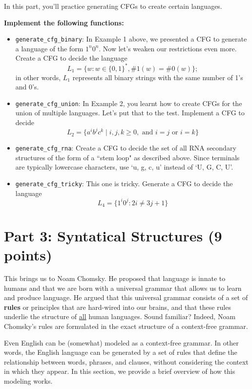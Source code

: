 \documentclass{article}
\begin{document}
\begin{tcolorbox}[enhanced,interior style={top color=Dandelion!20,bottom color=Dandelion!30}]
    In this part, you'll practice generating CFGs to create certain languages.
    
    \textbf{Implement the following functions:}
    
    \begin{itemize}
        \item \lstinline{generate_cfg_binary}: In Example 1 above, we presented a CFG to generate a language of the form $1^{n}0^{n}$. Now let's weaken our restrictions even more. Create a CFG to decide the language $$L_{1} = \{w : w \in \{0, 1\}^{*}, \#1(w) = \#0(w)\};$$ in other words, $L_{1}$ represents all binary strings with the same number of 1's and 0's.
        
        \item \lstinline{generate_cfg_union}: In Example 2, you learnt how to create CFGs for the union of multiple languages. Let's put that to the test. Implement a CFG to decide $$L_{2} = \{a^{i}b^{j}c^{k} \mid i, j, k \ge 0, \text{ and } i = j \text{ or } i = k\}$$
        \item \lstinline{generate_cfg_rna}: Create a CFG to decide the set of all RNA secondary structures of the form of a ``stem loop" as described above. Since terminals are typically lowercase characters, use `u, g, c, u' instead of `U, G, C, U'.
        \item \lstinline{generate_cfg_tricky}: This one is tricky. Generate a CFG to decide the language $$L_{4} = \{1^{i}0^{j} : 2i \ne 3j + 1\}$$
    \end{itemize}
\end{tcolorbox}

\section*{Part 3: Syntatical Structures (9 points)}
    This brings us to Noam Chomsky. He proposed that language is innate to humans and that we are born with a universal grammar that allows us to learn and produce language. He argued that this universal grammar consists of a set of \textbf{rules} or principles that are hard-wired into our brains, and that these rules underlie the structure of \underline{all} human languages. Sound familiar? Indeed, Noam Chomsky's rules are formulated in the exact structure of a context-free grammar.

    \vspace{2mm}
    Even English can be (somewhat) modeled as a context-free grammar. In other words, the English language can be generated by a set of rules that define the relationship between words, phrases, and clauses, without considering the context in which they appear. In this section, we provide a brief overview of how this modeling works.
    
\end{document}
